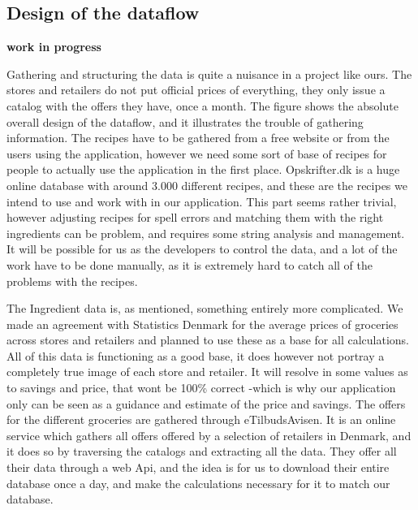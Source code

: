 \subsection{Design of the dataflow}\label{subsec:dataflow}

\textbf{work in progress}

Gathering and structuring the data is quite a nuisance in a project like ours. The stores and retailers do not put official prices of everything, they only issue a catalog with the offers they have, once a month. The figure  shows the absolute overall design of the dataflow, and it illustrates the trouble of gathering information. The recipes have to be gathered from a free website or from the users using the application, however we need some sort of base of recipes for people to actually use the application in the first place. Opskrifter.dk is a huge online database with around 3.000 different recipes, and these are the recipes we intend to use and work with in our application. This part seems rather trivial, however adjusting recipes for spell errors and matching them with the right ingredients can be problem, and requires some string analysis and management. It will be possible for us as the developers to control the data, and a lot of the work have to be done manually, as it is extremely hard to catch all of the problems with the recipes.

The Ingredient data is, as mentioned, something entirely more complicated. We made an agreement with Statistics Denmark for the average prices of groceries across stores and retailers and planned to use these as a base for all calculations. All of this data is functioning as a good base, it does however not portray a completely true image of each store and retailer. It will resolve in some values as to savings and price, that wont be 100\% correct -which is why our application only can be seen as a guidance and estimate of the price and savings. The offers for the different groceries are gathered through eTilbudsAvisen. It is an online service which gathers all offers offered by a selection of retailers in Denmark, and it does so by traversing the catalogs and extracting all the data. They offer all their data through a web Api, and the idea is for us to download their entire database once a day, and make the calculations necessary for it to match our database. 

